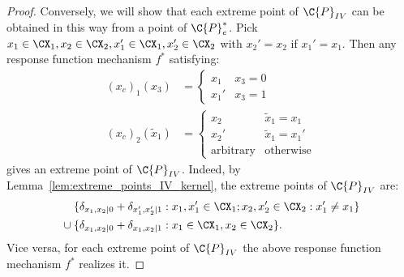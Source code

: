 \begin{proof}
  Conversely, we will show that each extreme point of $\C{P}_{IV}$ can be obtained in this way from a point of $\C{P}_e^*$.
  Pick $x_1 \in \CX_1,x_2 \in \CX_2,x_1' \in \CX_1,x_2' \in \CX_2$ with $x_2'=x_2$ if $x_1'=x_1$.
  Then any response function mechanism $f^*$ satisfying:
  \begin{align*}
    (x_c)_1(x_3) &= \begin{cases} x_1 & x_3=0 \\ x_1' & x_3=1 \end{cases} \\
      (x_c)_2(\tilde{x}_1) &= \begin{cases} x_2 & \tilde{x}_1=x_1 \\ x_2' & \tilde{x}_1=x_1' \\ \text{arbitrary} & \text{otherwise} \end{cases}
  \end{align*}
  gives an extreme point of $\C{P}_{IV}$. Indeed, by Lemma~\ref{lem:extreme_points_IV_kernel}, the extreme points of $\C{P}_{IV}$ are:
  \begin{equation*}\begin{split}
    & \phantom{{} \cup {}}\{\delta_{x_1,x_2|0} + \delta_{x_1',x_2'|1} : x_1,x_1' \in \CX_1; x_2,x_2' \in \CX_2 : x_1' \ne x_1\} \\
    & {} \cup \{\delta_{x_1,x_2|0} + \delta_{x_1,x_2|1} : x_1 \in \CX_1, x_2 \in \CX_2\}.
  \end{split}\end{equation*}
  Vice versa, for each extreme point of $\C{P}_{IV}$ the above response function mechanism $f^*$ realizes it.
\end{proof}

